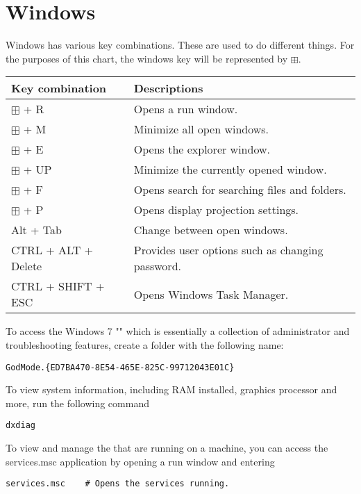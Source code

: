 \chapter{Windows}
\thispagestyle{fancy}
\lstset{}\lstset{language=Bash, style=shellstyle}

\begin{fancybox}{}	
	Windows has various key combinations. These are used to do different things. For the purposes of this chart, the windows key will be represented by $\boxplus$.
	\begin{center}
		\begin{tabular}{l|l}
			Key combination & Descriptions \\
			\hline
			$\boxplus$ + R & Opens a run window. \\
			$\boxplus$ + M & Minimize all open windows. \\
			$\boxplus$ + E & Opens the explorer window. \\
			$\boxplus$ + UP & Minimize the currently opened window. \\
			$\boxplus$ + F & Opens search for searching files and folders. \\
			$\boxplus$ + P & Opens display projection settings. \\
			Alt + Tab & Change between open windows. \\
			CTRL + ALT + Delete & Provides user options such as changing password. \\
			CTRL + SHIFT + ESC & Opens Windows Task Manager. 
		\end{tabular}
	\end{center}
\end{fancybox}

To access the Windows 7 "" which is essentially a collection of administrator and troubleshooting features, create a folder with the following name:
\begin{lstlisting}
GodMode.{ED7BA470-8E54-465E-825C-99712043E01C}
\end{lstlisting}

To view system information, including RAM installed, graphics processor and more, run the following command
\begin{lstlisting}[style=terminalstyle]
dxdiag
\end{lstlisting} 

To view and manage the  that are running on a machine, you can access the services.msc application by opening a run window and entering 
\begin{lstlisting}[style=terminalstyle]
services.msc	# Opens the services running.
\end{lstlisting}

